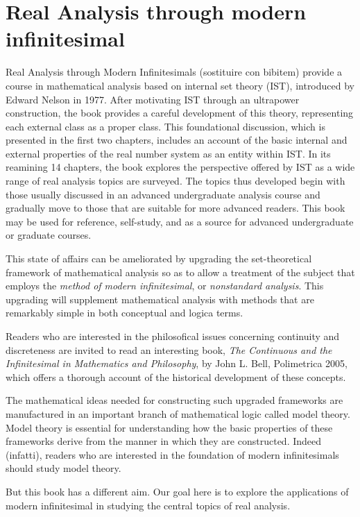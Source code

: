 \chapter{Real Analysis through modern infinitesimal}
Real Analysis through Modern Infinitesimals (sostituire con bibitem) provide a course in mathematical analysis based on internal set theory (IST), introduced by Edward Nelson in 1977. After motivating IST through an ultrapower construction, the book provides a careful development of this theory, representing each external class as a proper class. This foundational discussion, which is presented in the first two chapters, includes an account of the basic internal and external properties of the real number system as an entity within IST. In its reamining 14 chapters, the book explores the perspective offered by IST as a wide range of real analysis topics are surveyed. The topics thus developed begin with those usually discussed in an advanced undergraduate analysis course and gradually move to those that are suitable for more advanced readers. This book may be used for reference, self-study, and as a source for advanced undergraduate or graduate courses.

This state of affairs can be ameliorated by upgrading the set-theoretical framework of mathematical analysis so as to allow a treatment of the subject that employs the \emph{method of modern infinitesimal}, or \emph{nonstandard analysis}. This upgrading will supplement mathematical analysis with methods that are remarkably simple in both conceptual and logica terms.

Readers who are interested in the philosofical issues concerning continuity and discreteness are invited to read an interesting book, \emph{The Continuous and the Infinitesimal in Mathematics and Philosophy}, by John L. Bell, Polimetrica 2005, which offers a thorough account of the historical development of these concepts.

The mathematical ideas needed for constructing such upgraded frameworks are manufactured in an important branch of mathematical logic called model theory. Model theory is essential for understanding how the basic properties of these frameworks derive from the manner in which they are constructed. Indeed (infatti), readers who are interested in the foundation of modern infinitesimals should study model theory.

But this book has a different aim. Our goal here is to explore the applications of modern infinitesimal in studying the central topics of real analysis.

